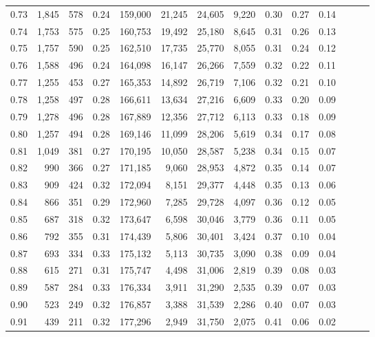 \begin{tabular}{rrrrrrrrrrrrrr}
0.73 &  1,845 &  578 &  0.24 &  159,000 &   21,245 &  24,605 &   9,220 &  0.30 &  0.27 &      0.14 \\
0.74 &  1,753 &  575 &  0.25 &  160,753 &   19,492 &  25,180 &   8,645 &  0.31 &  0.26 &      0.13 \\
0.75 &  1,757 &  590 &  0.25 &  162,510 &   17,735 &  25,770 &   8,055 &  0.31 &  0.24 &      0.12 \\
0.76 &  1,588 &  496 &  0.24 &  164,098 &   16,147 &  26,266 &   7,559 &  0.32 &  0.22 &      0.11 \\
0.77 &  1,255 &  453 &  0.27 &  165,353 &   14,892 &  26,719 &   7,106 &  0.32 &  0.21 &      0.10 \\
0.78 &  1,258 &  497 &  0.28 &  166,611 &   13,634 &  27,216 &   6,609 &  0.33 &  0.20 &      0.09 \\
0.79 &  1,278 &  496 &  0.28 &  167,889 &   12,356 &  27,712 &   6,113 &  0.33 &  0.18 &      0.09 \\
0.80 &  1,257 &  494 &  0.28 &  169,146 &   11,099 &  28,206 &   5,619 &  0.34 &  0.17 &      0.08 \\
0.81 &  1,049 &  381 &  0.27 &  170,195 &   10,050 &  28,587 &   5,238 &  0.34 &  0.15 &      0.07 \\
0.82 &    990 &  366 &  0.27 &  171,185 &    9,060 &  28,953 &   4,872 &  0.35 &  0.14 &      0.07 \\
0.83 &    909 &  424 &  0.32 &  172,094 &    8,151 &  29,377 &   4,448 &  0.35 &  0.13 &      0.06 \\
0.84 &    866 &  351 &  0.29 &  172,960 &    7,285 &  29,728 &   4,097 &  0.36 &  0.12 &      0.05 \\
0.85 &    687 &  318 &  0.32 &  173,647 &    6,598 &  30,046 &   3,779 &  0.36 &  0.11 &      0.05 \\
0.86 &    792 &  355 &  0.31 &  174,439 &    5,806 &  30,401 &   3,424 &  0.37 &  0.10 &      0.04 \\
0.87 &    693 &  334 &  0.33 &  175,132 &    5,113 &  30,735 &   3,090 &  0.38 &  0.09 &      0.04 \\
0.88 &    615 &  271 &  0.31 &  175,747 &    4,498 &  31,006 &   2,819 &  0.39 &  0.08 &      0.03 \\
0.89 &    587 &  284 &  0.33 &  176,334 &    3,911 &  31,290 &   2,535 &  0.39 &  0.07 &      0.03 \\
0.90 &    523 &  249 &  0.32 &  176,857 &    3,388 &  31,539 &   2,286 &  0.40 &  0.07 &      0.03 \\
0.91 &    439 &  211 &  0.32 &  177,296 &    2,949 &  31,750 &   2,075 &  0.41 &  0.06 &      0.02 \\

\end{tabular}
